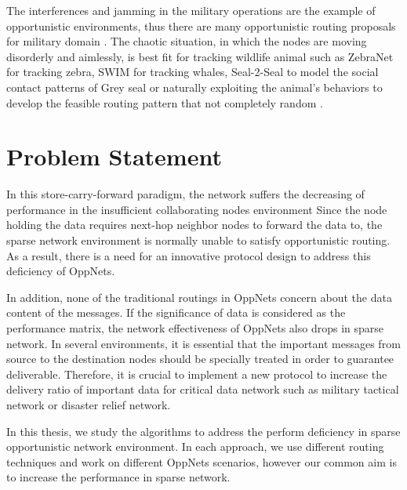 The interferences and jamming in the military operations are the example of opportunistic environments, thus there are many opportunistic routing proposals for military domain \cite{Kerdsri2012a,Scott2005,Kidston2012,Haillot2009}.
The chaotic situation, in which the nodes are moving disorderly and aimlessly, is best fit for tracking wildlife animal such as ZebraNet \cite{zebranet2004} for tracking zebra, SWIM \cite{Small2003} for tracking whales, Seal-2-Seal \cite{Lindgren2008} to model the social contact patterns of Grey seal or naturally exploiting the animal’s behaviors to develop the feasible routing pattern that not completely random \cite{Yu2007a}.





\section{Problem Statement}
\label{intro:Problem Statement}
In this store-carry-forward paradigm, the network suffers the decreasing of performance in the insufficient collaborating nodes environment \cite{Nousiainen2013,Spyropoulos2010}
Since the node holding the data requires next-hop neighbor nodes to forward the data to, the sparse network environment is normally unable to satisfy opportunistic routing.
As a result, there is a need for an innovative protocol design to address this deficiency of OppNets.

In addition, none of the traditional routings in OppNets concern about the data content of the messages. 
If the significance of data is considered as the performance matrix, the network effectiveness of OppNets also drops in sparse network. 
In several environments, it is essential that the important messages from source to the destination nodes should be specially treated in order to guarantee deliverable.
Therefore, it is crucial to implement a new protocol to increase the delivery ratio of important data for critical data network such as military tactical network or disaster relief network.

In this thesis, we study the algorithms to address the perform deficiency in sparse opportunistic network environment.
In each approach, we use different routing techniques and work on different OppNets scenarios, however our common aim is to increase the performance in sparse network.
